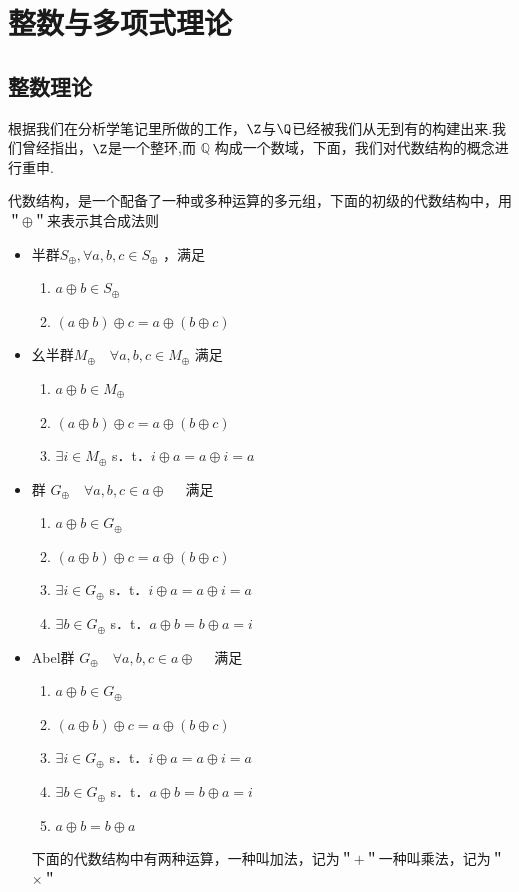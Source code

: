 \setchapterintro{}
\chapter{整数与多项式理论}
\section{整数理论}
根据我们在分析学笔记里所做的工作，$\Z$与$\Q$已经被我们从无到有的构建出来.我们曾经指出，$\Z$是一个整环,而 $\mathbb{Q}$ 构成一个数域，下面，我们对代数结构的概念进行重申.
\begin{definition}
	代数结构，是一个配备了一种或多种运算的多元组，下面的初级的代数结构中，用＂$\oplus$＂来表示其合成法则
	\begin{itemize}
		\item 半群$S _\oplus, \forall a, b,c \in S _\oplus$ ，满足
		\begin{enumerate}
			\item$a \oplus b \in S _\oplus$
			\item$(a \oplus b) \oplus c=a \oplus(b \oplus c)$
		\end{enumerate}
		\item 幺半群$M _\oplus \quad \forall a, b,c \in M _\oplus$ 满足
		\begin{enumerate}
			\item $a \oplus b \in M _\oplus$
			\item$(a \oplus b) \oplus c=a \oplus(b \oplus c)$
			\item$\exists i \in M _\oplus$ s．t．$i \oplus a=a \oplus i=a$
		\end{enumerate}
		\item 群 $G_ \oplus \quad \forall a, b, c \in a \oplus \quad$ 满足
		\begin{enumerate}
			\item $a \oplus b \in G _\oplus$
			\item$(a \oplus b) \oplus c=a \oplus(b \oplus c)$
			\item$\exists i \in G _\oplus$ s．t．$i \oplus a=a \oplus i=a$
			\item $\exists b \in G _\oplus$ s．t．$a \oplus b=b \oplus a=i$
		\end{enumerate}
		\item Abel群 $G_ \oplus \quad \forall a, b, c \in a \oplus \quad$ 满足
		\begin{enumerate}
			\item $a \oplus b \in G _\oplus$
			\item$(a \oplus b) \oplus c=a \oplus(b \oplus c)$
			\item$\exists i \in G _\oplus$ s．t．$i \oplus a=a \oplus i=a$
			\item $\exists b \in G _\oplus$ s．t．$a \oplus b=b \oplus a=i$
			\item $a\oplus b=b\oplus a$
		\end{enumerate}
		下面的代数结构中有两种运算，一种叫加法，记为＂$+$＂一种叫乘法，记为＂$\times$＂
		

\end{itemize}
\end{definition}
